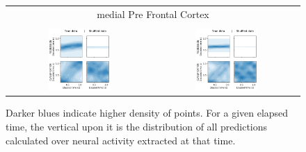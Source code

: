 \begin{figure}[ht]
\begin{tabular}{cc}
    \multicolumn{2}{1}{{\large medial Pre Frontal Cortex}}\\\\
    \includegraphics[width=0.45\textwidth]{figures/mpfc_kde_bootstrap_vs_true_day1.png}    &  
    \includegraphics[width=0.45\textwidth]{figures/mpfc_kde_bootstrap_vs_true_day2.png}\\
    \end{tabular}
    \caption[Prediction density plots in the first vs second sessions]{Darker blues indicate higher density of points. For a given elapsed time, the vertical upon it is the distribution of all predictions calculated over neural activity extracted at that time.}
    \label{fig:evolution_representation_density}
\end{figure}